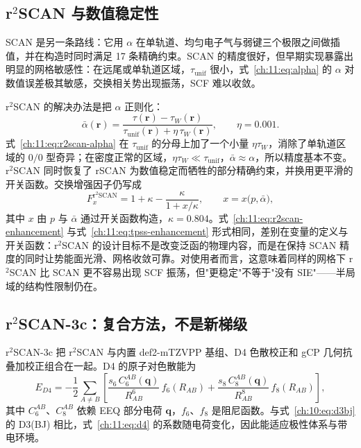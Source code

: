 \subsection{r$^2$SCAN 与数值稳定性}
\label{ch:11:sec:r2scan}

SCAN 是另一条路线：它用 $\alpha$ 在单轨道、均匀电子气与弱键三个极限之间做插值，并在构造时同时满足 17 条精确约束\citep{sun2015scan}。SCAN 的精度很好，但早期实现暴露出明显的网格敏感性：在远尾或单轨道区域，$\tau_{\mathrm{unif}}$ 很小，式~\eqref{ch:11:eq:alpha} 的 $\alpha$ 对数值误差极其敏感，交换相关势出现振荡，SCF 难以收敛。

r$^2$SCAN 的解决办法是把 $\alpha$ 正则化\citep{furness2020r2scan}：
\begin{equation}
\bar{\alpha}(\mathbf r)
= \frac{\tau(\mathbf r)-\tau_W(\mathbf r)}
{\tau_{\mathrm{unif}}(\mathbf r)+\eta\,\tau_W(\mathbf r)},
\qquad
\eta=0.001 .
\label{ch:11:eq:r2scan-alpha}
\end{equation}
式~\eqref{ch:11:eq:r2scan-alpha} 在 $\tau_{\mathrm{unif}}$ 的分母上加了一个小量 $\eta\tau_W$，消除了单轨道区域的 $0/0$ 型奇异；在密度正常的区域，$\eta\tau_W\ll\tau_{\mathrm{unif}}$，$\bar{\alpha}\approx\alpha$，所以精度基本不变。r$^2$SCAN 同时恢复了 rSCAN 为数值稳定而牺牲的部分精确约束，并换用更平滑的开关函数。交换增强因子仍写成
\begin{equation}
F_x^{\mathrm{r}^2\mathrm{SCAN}}
= 1+\kappa-\frac{\kappa}{1+x/\kappa},
\qquad
x=x\big(p,\bar{\alpha}\big),
\label{ch:11:eq:r2scan-enhancement}
\end{equation}
其中 $x$ 由 $p$ 与 $\bar{\alpha}$ 通过开关函数构造，$\kappa=0.804$。式~\eqref{ch:11:eq:r2scan-enhancement} 与式~\eqref{ch:11:eq:tpss-enhancement} 形式相同，差别在变量的定义与开关函数：r$^2$SCAN 的设计目标不是改变泛函的物理内容，而是在保持 SCAN 精度的同时让势能面光滑、网格收敛可靠。对使用者而言，这意味着同样的网格下 r$^2$SCAN 比 SCAN 更不容易出现 SCF 振荡，但"更稳定"不等于"没有 SIE"——半局域的结构性限制仍在。

\subsection{r$^2$SCAN-3c：复合方法，不是新梯级}
\label{ch:11:sec:r2scan3c}

r$^2$SCAN-3c 把 r$^2$SCAN 与内置 def2-mTZVPP 基组、D4 色散校正和 gCP 几何抗叠加校正组合在一起\citep{grimme2021r2scan3c}。D4 的原子对色散能为
\begin{equation}
E_{D4}
= -\frac12\sum_{A\neq B}\left[
\frac{s_6\,C_6^{AB}(\mathbf q)}{R_{AB}^6}\,f_6(R_{AB})
+\frac{s_8\,C_8^{AB}(\mathbf q)}{R_{AB}^8}\,f_8(R_{AB})
\right],
\label{ch:11:eq:d4}
\end{equation}
其中 $C_6^{AB}$、$C_8^{AB}$ 依赖 EEQ 部分电荷 $\mathbf q$，$f_6$、$f_8$ 是阻尼函数\citep{caldeweyher2019d4}。与式~\eqref{ch:10:eq:d3bj} 的 D3(BJ) 相比，式~\eqref{ch:11:eq:d4} 的系数随电荷变化，因此能适应极性体系与带电环境。


